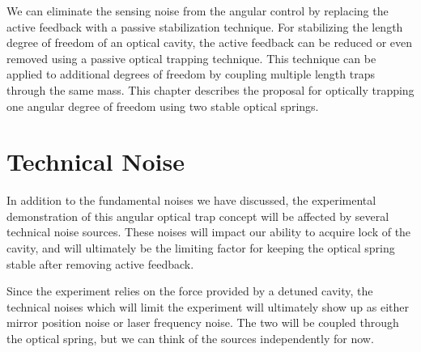 \acresetall




We can eliminate the sensing noise from the angular control by replacing the
active feedback with a passive stabilization technique.
For stabilizing the length degree of freedom of an optical cavity, the active
feedback can be reduced or even removed using a passive optical trapping
technique.\cite{Corbitt07}
This technique can be applied to additional degrees of freedom by coupling
multiple length traps through the same mass.
This chapter describes the proposal for optically trapping one angular degree
of freedom using two stable optical springs.









%

\section{Technical Noise}

%
%
In addition to the fundamental noises we have discussed, the
experimental demonstration of this angular optical trap concept will
be affected by several technical noise sources.
These noises will impact our ability to acquire lock of the
cavity, and will ultimately be the limiting factor for keeping the optical
spring stable after removing active feedback.


Since the experiment relies on the force provided by a detuned cavity, the
technical noises which will limit the experiment will ultimately show up as
either mirror position noise or laser frequency noise.
The two will be coupled through the optical spring, but we can think of the
sources independently for now.

